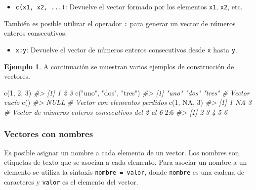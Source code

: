\documentclass[
]{book}
\newenvironment{Shaded}{\begin{snugshade}}{\end{snugshade}}
\newcommand{\CommentTok}[1]{\textcolor[rgb]{0.56,0.35,0.01}{\textit{#1}}}
\newcommand{\ConstantTok}[1]{\textcolor[rgb]{0.00,0.00,0.00}{#1}}
\newcommand{\DecValTok}[1]{\textcolor[rgb]{0.00,0.00,0.81}{#1}}
\newcommand{\FunctionTok}[1]{\textcolor[rgb]{0.00,0.00,0.00}{#1}}
\newcommand{\NormalTok}[1]{#1}
\newcommand{\SpecialCharTok}[1]{\textcolor[rgb]{0.00,0.00,0.00}{#1}}
\newcommand{\StringTok}[1]{\textcolor[rgb]{0.31,0.60,0.02}{#1}}
\providecommand{\tightlist}{%
  \setlength{\itemsep}{0pt}\setlength{\parskip}{0pt}}
\theoremstyle{definition}
\theoremstyle{definition}
\newtheorem{example}{Ejemplo}[chapter]
\theoremstyle{definition}
\theoremstyle{definition}
\theoremstyle{remark}
\begin{document}
\begin{itemize}
\tightlist
\item
  \texttt{c(x1,\ x2,\ ...)}: Devuelve el vector formado por los elementos \texttt{x1}, \texttt{x2}, etc.
\end{itemize}

También es posible utilizar el operador \texttt{:} para generar un vector de números enteros consecutivos:

\begin{itemize}
\tightlist
\item
  \texttt{x:y}: Devuelve el vector de números enteros consecutivos desde \texttt{x} hasta \texttt{y}.
\end{itemize}

\begin{example}

A continuación se muestran varios ejemplos de construcción de vectores.

\begin{Shaded}
\begin{Highlighting}[]
\FunctionTok{c}\NormalTok{(}\DecValTok{1}\NormalTok{, }\DecValTok{2}\NormalTok{, }\DecValTok{3}\NormalTok{)}
\CommentTok{\#\textgreater{} [1] 1 2 3}
\FunctionTok{c}\NormalTok{(}\StringTok{"uno"}\NormalTok{, }\StringTok{"dos"}\NormalTok{, }\StringTok{"tres"}\NormalTok{)}
\CommentTok{\#\textgreater{} [1] "uno"  "dos"  "tres"}
\CommentTok{\# Vector vacío}
\FunctionTok{c}\NormalTok{()}
\CommentTok{\#\textgreater{} NULL}
\CommentTok{\# Vector con elementos perdidos}
\FunctionTok{c}\NormalTok{(}\DecValTok{1}\NormalTok{, }\ConstantTok{NA}\NormalTok{, }\DecValTok{3}\NormalTok{)}
\CommentTok{\#\textgreater{} [1]  1 NA  3}
\CommentTok{\# Vector de números enteros consecutivos del 2 al 6}
\DecValTok{2}\SpecialCharTok{:}\DecValTok{6}
\CommentTok{\#\textgreater{} [1] 2 3 4 5 6}
\end{Highlighting}
\end{Shaded}

\end{example}

\hypertarget{vectores-con-nombres}{%
\subsubsection{Vectores con nombres}\label{vectores-con-nombres}}

Es posible asignar un nombre a cada elemento de un vector. Los nombres son etiquetas de texto que se asocian a cada elemento. Para asociar un nombre a un elemento se utiliza la sintaxis \texttt{nombre\ =\ valor}, donde \texttt{nombre} es una cadena de caracteres y \texttt{valor} es el elemento del vector.
\end{document}
